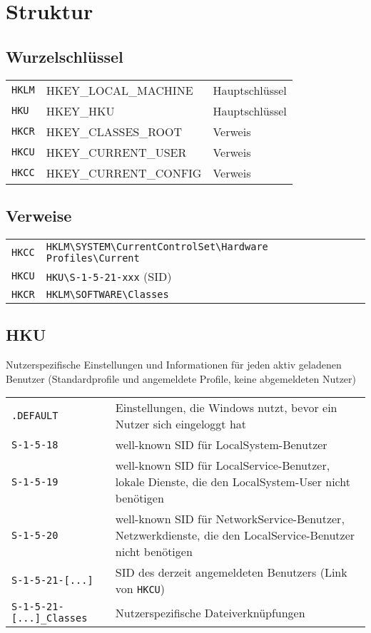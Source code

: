 \section{Struktur}
\subsection{Wurzelschlüssel}
\begin{tabular}{@{}p{\MyLen}%
				@{}p{\MyLenTwo}%
				@{}p{\linewidth-\the\MyLen-\the\MyLenTwo}@{}}
\texttt{HKLM} & HKEY\_LOCAL\_MACHINE & Hauptschlüssel \\
\texttt{HKU} & HKEY\_HKU & Hauptschlüssel \\
\texttt{HKCR} & HKEY\_CLASSES\_ROOT & Verweis\\
\texttt{HKCU} & HKEY\_CURRENT\_USER & Verweis\\
\texttt{HKCC} & HKEY\_CURRENT\_CONFIG & Verweis \\
\end{tabular}

\subsection{Verweise}
\settowidth{\MyLen}{HKCR.sp }
\begin{tabular}{@{}p{\the\MyLen}%
		@{}p{\linewidth-\the\MyLen}@{}}
\texttt{HKCC} & \texttt{HKLM\textbackslash SYSTEM\textbackslash CurrentControlSet\textbackslash Hardware Profiles\textbackslash Current} \\
\texttt{HKCU} & \texttt{HKU\textbackslash S-1-5-21-xxx} (SID)\\
\texttt{HKCR} & \texttt{HKLM\textbackslash SOFTWARE\textbackslash Classes}
\end{tabular}

\subsection{HKU}
Nutzerspezifische Einstellungen und Informationen für jeden aktiv geladenen Benutzer (Standardprofile und angemeldete Profile, keine abgemeldeten Nutzer)
\settowidth{\MyLen}{SID.classes.length.long.}
\begin{tabular}{@{}p{\the\MyLen}%
		@{}p{\linewidth-\the\MyLen}@{}}
	\texttt{.DEFAULT} & Einstellungen, die Windows nutzt, bevor ein Nutzer sich eingeloggt hat \\
	\texttt{S-1-5-18} & well-known SID für LocalSystem-Benutzer\\
	\texttt{S-1-5-19} & well-known SID für LocalService-Benutzer, lokale Dienste, die den LocalSystem-User nicht benötigen\\
	\texttt{S-1-5-20} & well-known SID für NetworkService-Benutzer, Netzwerkdienste, die den LocalService-Benutzer nicht benötigen\\
	\texttt{S-1-5-21-[...]} & SID des derzeit angemeldeten Benutzers (Link von \texttt{HKCU})\\
	\texttt{S-1-5-21-[...]\_Classes} & Nutzerspezifische Dateiverknüpfungen\\
\end{tabular}

